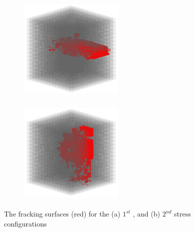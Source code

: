 \begin{figure}[!ht]
\begin{subfigure}[c]{0.48\textwidth}
\centering
\includegraphics[width=5cm,height=5cm]{figures/Amir_ME2_B_Fracture_a.png}
\subcaption{}
\label{fig:Amir_ME2_B_Fracture_a}
\end{subfigure}
\hfill
\begin{subfigure}[c]{0.48\textwidth}
\centering
\includegraphics[width=5cm,height=5cm]{figures/Amir_ME2_B_Fracture_b.png}
\subcaption{}
\label{fig:Amir_ME2_B_Fracture_b}
\end{subfigure}
\caption{The fracking surfaces (red) for the (a) $1^{st}$ , and (b) $2^{nd}$ stress configurations}
\end{figure}

